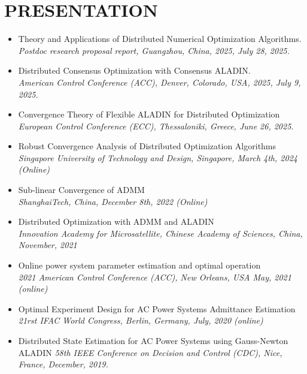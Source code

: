 \documentclass[paper=a4,fontsize=11pt]{scrartcl} %
\newcommand{\NewPart}[1]{\section*{\uppercase{#1}}}
\begin{document}
\NewPart{PRESENTATION}{}
\begin{itemize}

\item  {
	{ Theory and Applications of Distributed Numerical Optimization Algorithms.}\\
	\emph{Postdoc research proposal report, Guangzhou,  China, 2025, July 28, 2025.
} }

\item  {
	{ Distributed Consensus Optimization with Consensus ALADIN.}\\
	\emph{American Control Conference (ACC), Denver, Colorado, USA, 2025, July 9, 2025.
} }

	
		\item  {
		{ Convergence Theory of Flexible ALADIN for Distributed Optimization}\\
		\emph{European Control Conference (ECC), Thessaloniki, Greece, June 26, 2025.
	} }
		\item  {
		{Robust Convergence Analysis of Distributed Optimization Algorithms}\\
		\emph{Singapore University of Technology and Design, Singapore, March 4th, 2024 (Online)
	} }
	
		\item  {
		{Sub-linear Convergence of ADMM}\\
		\emph{ShanghaiTech, China, December 8th, 2022 (Online)
	} }
	
	\item  {
		{Distributed Optimization with ADMM and ALADIN}\\
		\emph{Innovation Academy for Microsatellite, Chinese Academy of Sciences, China,
			November, 2021
	} }
	
	\item  {
		{Online power system parameter estimation and optimal operation}\\
		\emph{2021 American Control Conference (ACC), New Orleans, USA May, 2021 (online)
	} }
	
	\item  {
		Optimal Experiment Design for AC Power Systems Admittance Estimation\\
		\emph{21rst IFAC World Congress, Berlin, Germany, July, 2020 (online)
	} }
	
	\item  {
		Distributed State Estimation for AC Power Systems using Gauss-Newton ALADIN 
		\emph{58th IEEE Conference on Decision and Control (CDC),
			Nice, France, December, 2019.} }
\end{itemize}
\end{document}
